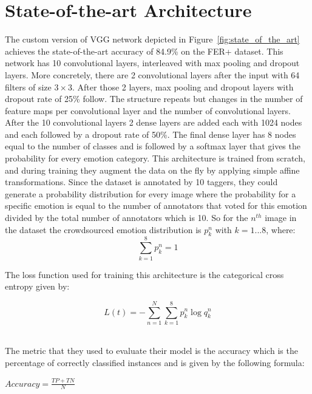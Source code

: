 \section{State-of-the-art Architecture}
The custom version of VGG network depicted in Figure~\ref{fig:state_of_the_art} achieves the state-of-the-art accuracy of 84.9\% on the FER+ dataset. This network has 10 convolutional layers, interleaved with max pooling and dropout layers. More concretely, there are 2 convolutional layers after the input with 64 filters of size $3\times 3$. After those 2 layers, max pooling and dropout layers with dropout rate of 25\% follow. The structure repeats but changes in the number of feature maps per convolutional layer and the number of convolutional layers. After the 10 convolutional layers 2 dense layers are added each with 1024 nodes and each followed by a dropout rate of 50\%. The final dense layer has 8 nodes equal to the number of classes and is followed by a softmax layer that gives the probability for every emotion category. This architecture is trained from scratch, and during training they augment the data on the fly by applying simple affine transformations. Since the dataset is annotated by 10 taggers, they could generate a probability distribution for every image where the probability for a specific emotion is equal to the number of annotators that voted for this emotion divided by the total number of annotators which is 10. So for the $n^{th}$ image in the dataset the crowdsourced emotion distribution is $p_{k}^{n}$ with $k=1...8$, where:
$$\sum_{k=1}^{8}p_k^{n}=1$$

The loss function used for training this architecture is the categorical cross entropy given by:
\begin{center}
$$L(t) = -\sum_{n=1}^{N}\sum_{k=1}^{8}p_{k}^{n}\log q_{k}^{n}$$\\
\end{center}

The metric that they used to evaluate their model is the accuracy which is the percentage of correctly classified instances and is given by the following formula:
\begin{center}
$Accuracy = \frac{TP + TN}{N}$\\
\end{center}

